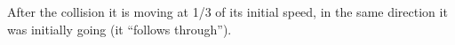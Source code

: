 After the collision it is moving at 1/3 of its initial speed, in the same direction
it was initially going (it ``follows through'').
